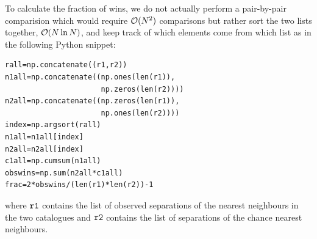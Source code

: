 \documentclass[useAMS,usenatbib]{mn2e}
\begin{document}
To calculate the fraction of wins, we do not actually perform a pair-by-pair
comparision which would require ${\cal O}(N^2)$ comparisons but rather sort the
two lists together, ${\cal O}(N \ln N)$, and keep track of which elements
come from which list as in the following Python snippet:
\begin{verbatim}
rall=np.concatenate((r1,r2))
n1all=np.concatenate((np.ones(len(r1)),
                      np.zeros(len(r2))))
n2all=np.concatenate((np.zeros(len(r1)),
                      np.ones(len(r2))))
index=np.argsort(rall)
n1all=n1all[index]
n2all=n2all[index]
c1all=np.cumsum(n1all)
obswins=np.sum(n2all*c1all)
frac=2*obswins/(len(r1)*len(r2))-1
\end{verbatim}
where ${\tt r1}$ contains the list of observed separations of the
nearest neighbours in the two catalogues and ${\tt r2}$ contains the
list of separations of the chance nearest neighbours.
    
\label{lastpage}
\end{document}
